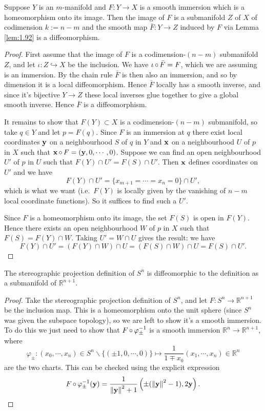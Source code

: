 \documentclass[a4paper,11pt]{article}
\begin{document}
	\begin{prop}
		Suppose $Y$ is an $m$-manifold and $F : Y \to X$ is a smooth immersion which is a homeomorphism onto its image. Then the image of $F$ is a submanifold $Z$ of $X$ of codimension $k := n - m$ and the smooth map $\bar{F} : Y \to Z$ induced by $F$ via Lemma \ref{lem:1.92} is a diffeomorphism.
	\end{prop}
	\begin{proof}
		First assume that the image of $F$ is a codimension-$(n-m)$ submanifold $Z$, and let $\iota : Z \hookrightarrow X$ be the inclusion. We have $\iota \operatorname{\circ} \bar{F} = F$, which we are assuming is an immersion. By the chain rule $\bar F$ is then also an immersion, and so by dimension it is a local diffeomorphism. Hence $\bar F$ locally has a smooth inverse, and since it's bijective $Y \to Z$ these local inverses glue together to give a global smooth inverse. Hence $\bar F$ is a diffeomorphism.

		It remains to show that $F(Y) \subset X$ is a codimension-$(n-m)$ submanifold, so take $q \in Y$ and let $p = F(q)$. Since $F$ is an immersion at $q$ there exist local coordinates $\vb y$ on a neighbourhood $S$ of $q$ in $Y$ and $\vb x$ on a neighbourhood $U$ of $p$ in $X$ such that $\vb x \operatorname{\circ} F = (\vb y, 0, \cdots, 0)$. Suppose we can find an open neighbourhood $U'$ of $p$ in $U$ such that $F(Y)\cap U' = F(S)\cap U'$. Then $\vb x$ defines coordinates on $U'$ and we have
		\[
			F(Y)\cap U' = \{x _{m+1} = \cdots = x_n = 0\}\cap U',
		\]
		which is what we want (i.e.\ $F(Y)$ is locally given by the vanishing of $n-m$ local coordinate functions). So it suffices to find such a $U'$.
		
		Since $F$ is a homeomorphism onto its image, the set $F(S)$ is open in $F(Y)$. Hence there exists an open neighbourhood $W$ of $p$ in $X$ such that $F(S)= F(Y)\cap W$. Taking $U' = W \cap U$ gives the result: we have
		\[
			F(Y)\cap U' = (F(Y)\cap W)\cap U = (F(S)\cap W)\cap U = F(S)\cap U'.
		\]
	\end{proof}

	\begin{prop}
		The stereographic projection definition of $S^n$ is diffeomorphic to the definition as a submanifold of $\mathbb{R}^{n+1}$.
	\end{prop}

	\begin{proof}
		Take the stereographic projection definition of $S^n$, and let $F: S^n \to \mathbb{R}^{n+1}$ be the inclusion map. This is a homeomorphism onto the unit sphere (since $S^n$ was given the subspace topology), so we are left to show it's a smooth immersion. To do this we just need to show that $F \operatorname{\circ} \varphi _{\pm}^{-1}$ is a smooth immersion $\mathbb{R}^n \to \mathbb{R}^{n+1}$, where
		\[
			\varphi_\pm : (x_0, \cdots, x_n) \in S^n \backslash \{(\pm 1, 0, \cdots, 0)\} \mapsto \frac{1}{1 \mp x_0} (x_1, \cdots, x_n)\in \mathbb{R}^n
		\]
		are the two charts. This can be checked using the explicit expression
		\[
			F \operatorname{\circ} \varphi_\pm^{-1} (\vb y) = \frac{1}{\norm{\vb y}^2 + 1} \left( \pm (\norm{\vb y}^2 - 1),2 \vb y \right).
		\]
	\end{proof}
\end{document}
